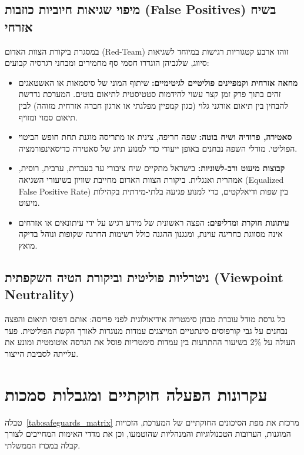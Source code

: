 \subsection{מיפוי שגיאות חיוביות כוזבות (\textenglish{False Positives}) בשיח אזרחי}
במסגרת ביקורת הצוות האדום (\textenglish{Red-Team}) זוהו ארבע קטגוריות רגישות במיוחד לשגיאות סיווג, שלגביהן הוגדרו חסמי סף מחמירים ומבחני רגרסיה קבועים:
\begin{itemize}
    \item \textbf{מחאה אזרחית וקמפיינים פוליטיים לגיטימיים:} שיתוף המוני של סיסמאות או האשטאגים זהים בתוך פרק זמן קצר עשוי להידמות סטטיסטית לתיאום בוטים. המערכת נדרשת להבחין בין תיאום אורגני גלוי (כגון קמפיין מפלגתי או ארגון חברה אזרחית מזוהה) לבין תיאום סמוי ומזויף.
    \item \textbf{סאטירה, פרודיה ושיח בוטה:} שפה חריפה, צינית או מתריסה מוגנת תחת חופש הביטוי הפוליטי. מודלי השפה נבחנים באופן ייעודי כדי למנוע תיוג של סאטירה כדיסאינפורמציה.
    \item \textbf{קבוצות מיעוט ורב-לשוניות:} בישראל מתקיים שיח ציבורי ער בעברית, ערבית, רוסית, אמהרית ואנגלית. ביקורת הצוות האדום מחייבת שוויון בשיעורי השגיאה (\textenglish{Equalized False Positive Rate}) בין שפות ודיאלקטים, כדי למנוע פגיעה בלתי-מידתית בקהילות מיעוט.
    \item \textbf{עיתונות חוקרת ומדליפים:} הפצה ראשונית של מידע רגיש על ידי עיתונאים או אזרחים אינה מסווגת כחריגה עוינת, ומנגנון ההגנה כולל רשימות החרגה שקופות ונוהל בדיקה מואץ.
\end{itemize}

\subsection{ניטרליות פוליטית וביקורת הטיה השקפתית (\textenglish{Viewpoint Neutrality})}
כל גרסת מודל עוברת מבחן סימטריה אידיאולוגית לפני פריסה: אותם דפוסי תיאום והפצה נבחנים על גבי קורפוסים סינתטיים המייצגים עמדות מנוגדות לאורך הקשת הפוליטית. פער העולה על \textenglish{2\%} בשיעור ההתרעות בין עמדות סימטריות פוסל את הגרסה אוטומטית ומונע את עלייתה לסביבת הייצור.

\section{עקרונות הפעלה חוקתיים ומגבלות סמכות}
\label{sec:constitutional_constraints}

טבלה~\ref{tab:safeguards_matrix} מרכזת את מפת הסיכונים החוקתיים של המערכת, הזכויות המוגנות, הערובות הטכנולוגיות והמנהליות שהוטמעו, וכן את מדדי האימות המחייבים לצורך קבלה במכרז הממשלתי.

